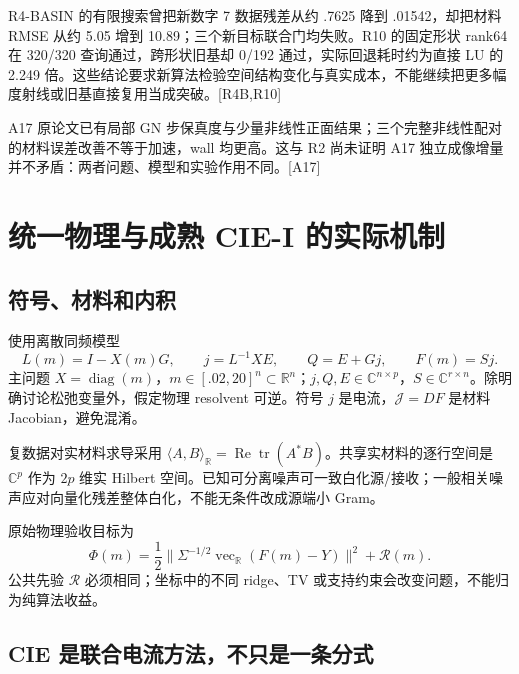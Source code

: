 \documentclass[10pt,a4paper]{article}
\begin{document}
R4-BASIN 的有限搜索曾把新数字 7 数据残差从约 .7625 降到 .01542，却把材料
RMSE 从约 5.05 增到 10.89；三个新目标联合门均失败。R10 的固定形状 rank64
在 320/320 查询通过，跨形状旧基却 0/192 通过，实际回退耗时约为直接 LU 的
2.249
倍。这些结论要求新算法检验空间结构变化与真实成本，不能继续把更多幅度射线或旧基直接复用当成突破。{[}R4B,R10{]}

A17 原论文已有局部 GN
步保真度与少量非线性正面结果；三个完整非线性配对的材料误差改善不等于加速，wall
均更高。这与 R2 尚未证明 A17
独立成像增量并不矛盾：两者问题、模型和实验作用不同。{[}A17{]}

\hypertarget{ux7edfux4e00ux7269ux7406ux4e0eux6210ux719f-cie-i-ux7684ux5b9eux9645ux673aux5236}{%
\section{统一物理与成熟 CIE-I
的实际机制}\label{ux7edfux4e00ux7269ux7406ux4e0eux6210ux719f-cie-i-ux7684ux5b9eux9645ux673aux5236}}

\hypertarget{ux7b26ux53f7ux6750ux6599ux548cux5185ux79ef}{%
\subsection{符号、材料和内积}\label{ux7b26ux53f7ux6750ux6599ux548cux5185ux79ef}}

使用离散同频模型
\[L(m)=I-X(m)G,\qquad j=L^{-1}XE,\qquad Q=E+Gj,\qquad F(m)=Sj.\] 主问题
\(X=\operatorname{diag}(m)\)，\(m\in[.02,20]^n\subset\mathbb R^n\)；\(j,Q,E\in\mathbb C^{n\times p}\)，\(S\in\mathbb C^{r\times n}\)。除明确讨论松弛变量外，假定物理
resolvent 可逆。符号 \(j\) 是电流，\(\mathcal J=DF\) 是材料
Jacobian，避免混淆。

复数据对实材料求导采用
\(\langle A,B\rangle_{\mathbb R}=\operatorname{Re}\operatorname{tr}(A^*B)\)。共享实材料的逐行空间是
\(\mathbb C^p\) 作为 \(2p\) 维实 Hilbert
空间。已知可分离噪声可一致白化源/接收；一般相关噪声应对向量化残差整体白化，不能无条件改成源端小
Gram。

原始物理验收目标为
\[\Phi(m)=\frac12\|\Sigma^{-1/2}\operatorname{vec}_{\mathbb R}(F(m)-Y)\|^2+\mathcal R(m).\]
公共先验 \(\mathcal R\) 必须相同；坐标中的不同 ridge、TV
或支持约束会改变问题，不能归为纯算法收益。

\hypertarget{cie-ux662fux8054ux5408ux7535ux6d41ux65b9ux6cd5ux4e0dux53eaux662fux4e00ux6761ux5206ux5f0f}{%
\subsection{CIE
是联合电流方法，不只是一条分式}\label{cie-ux662fux8054ux5408ux7535ux6d41ux65b9ux6cd5ux4e0dux53eaux662fux4e00ux6761ux5206ux5f0f}}
\end{document}
